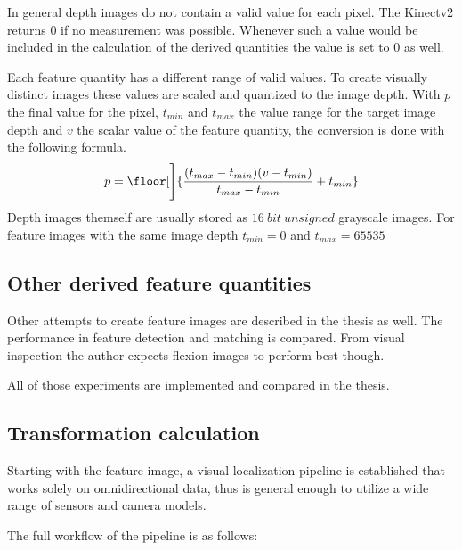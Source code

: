 In general depth images do not contain a valid value for each pixel.
The Kinectv2 returns $0$ if no measurement was possible.
Whenever such a value would be included in the calculation of the derived quantities the value is set to $0$ as well.

Each feature quantity has a different range of valid values.
To create visually distinct images these values are scaled and quantized to the image depth.
With $p$ the final value for the pixel, $t_{min}$ and $t_{max}$ the value range for the target image depth and $v$ the scalar value of the feature quantity, the conversion is done with the following formula.
\begin{align}
    p = \floor[\Bigg]{\frac{{(t_{max} - t_{min})} {(v - t_{min})}}{t_{max} - t_{min}} + t_{min}}
\end{align}
Depth images themself are usually stored as $16~bit~unsigned$ grayscale images.
For feature images with the same image depth $t_{min} = 0$ and $t_{max} = 65535$

\subsection{Other derived feature quantities}

Other attempts to create feature images are described in the thesis as well.
The performance in feature detection and matching is compared.
From visual inspection the author expects \Glspl{flexion-image} to perform best though.


All of those experiments are implemented and compared in the thesis.

\subsection{Transformation calculation}\label{transformation-calculation}

Starting with the feature image, a visual localization pipeline is
established that works solely on omnidirectional data, thus is general
enough to utilize a wide range of sensors and camera models.

The full workflow of the pipeline is as follows:

